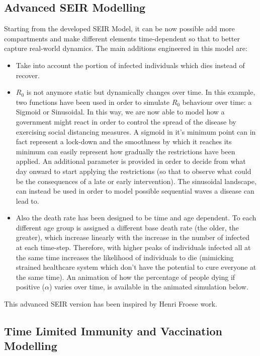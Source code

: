 \subsection{Advanced SEIR Modelling}
Starting from the developed SEIR Model, it can be now possible add more compartments and make different elements time-dependent so that to better capture real-world dynamics. The main additions engineered in this model are:
\begin{itemize}
    \item Take into account the portion of infected individuals which dies instead of recover.
    \item $R_{0}$ is not anymore static but dynamically changes over time. In this example, two functions have been used  in order to simulate $R_{0}$ behaviour over time: a Sigmoid or Sinusoidal. In this way, we are now able to model
    how a government might react in order to control the spread of the disease by exercising social distancing measures. A sigmoid in it's minimum point can in fact represent a lock-down and the smoothness by which it reaches its minimum can
    easily represent how gradually the restrictions have been applied. An additional parameter is provided in order to decide from what day onward to start applying the restrictions (so that to observe what could be the consequences of a late or early intervention). The sinusoidal landscape, can instead be used in order to model possible sequential waves a disease can lead to.
    \item Also the death rate has been designed to be time and age dependent. To each different age group is assigned a different base death rate (the older, the greater), which increase linearly with the increase in the number of infected at each time-step. Therefore, with higher peaks of individuals infected all at the same time increases the likelihood of individuals to die (mimicking strained healthcare system which don't have the potential to cure everyone at the same time). An animation of how the percentage of people dying if positive ($\alpha$) varies over time, is available in the animated simulation below.
\end{itemize}

This advanced SEIR version has been inspired by Henri Froese \cite{tds} work.

\subsection{Time Limited Immunity and Vaccination Modelling}

